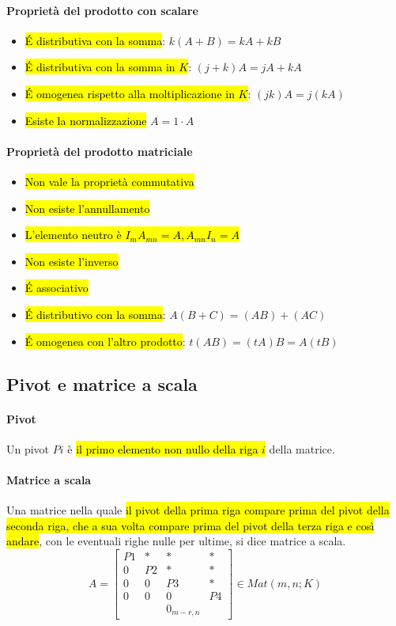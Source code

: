\documentclass[a4paper,12pt,oneside]{article}
\begin{document}
\paragraph{Proprietà del prodotto con scalare}
\begin{itemize}
    \item \hl{\'E distributiva con la somma}: $k (A + B) = kA + kB$
    \item \hl{\'E distributiva con la somma in $K$}: $(j + k)A = jA + kA$
    \item \hl{\'E omogenea rispetto alla moltiplicazione in $K$}:
        $(jk)A = j(kA)$
    \item \hl{Esiste la normalizzazione} $A = 1 \cdot A$
\end{itemize}

\paragraph{Proprietà del prodotto matriciale}
\begin{itemize}
    \item \hl{Non vale la proprietà commutativa}
    \item \hl{Non esiste l'annullamento}
    \item \hl{L'elemento neutro è $I_{m}A_{mn} = A, A_{mn}I_{n} = A$}
    \item \hl{Non esiste l'inverso}
    \item \hl{\'E associativo}
    \item \hl{\'E distributivo con la somma}: $A(B+C) = (AB) + (AC)$
    \item \hl{\'E omogenea con l'altro prodotto}: $t(AB) = (tA)B = A(tB)$
\end{itemize}

\subsection{Pivot e matrice a scala}
\paragraph{Pivot} Un pivot $Pi$ è \hl{il primo elemento non nullo della riga $i$}
della matrice.

\paragraph{Matrice a scala} Una matrice nella quale \hl{il pivot della prima riga
compare prima del pivot della seconda riga, che a sua volta compare prima del
pivot della terza riga e così andare}, con le eventuali righe nulle per ultime, si
dice matrice a scala.
\[
    A =
    \begin{bmatrix}
        P1 & *  & *  & * \\
        0  & P2 & *  & * \\
        0  & 0  & P3 & * \\
        0  & 0  & 0  & P4 \\
        & & 0_{m-r, n} &
    \end{bmatrix} \in Mat(m,n;K)
\]
\end{document}
